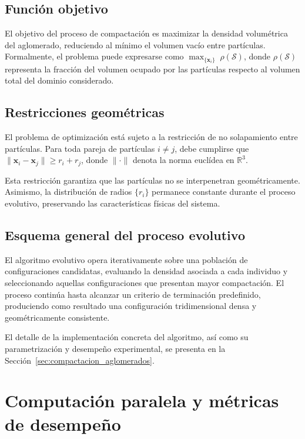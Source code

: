 \documentclass[a4paper,11pt]{book}
\begin{document}
\subsection{Función objetivo}

El objetivo del proceso de compactación es maximizar la densidad volumétrica del aglomerado, reduciendo al mínimo el volumen vacío entre partículas. Formalmente, el problema puede expresarse como $\max_{\{\mathbf{x}_i\}} \; \rho(\mathcal{S})$, donde $\rho(\mathcal{S})$ representa la fracción del volumen ocupado por las partículas respecto al volumen total del dominio considerado.

\subsection{Restricciones geométricas}

El problema de optimización está sujeto a la restricción de no solapamiento entre partículas. Para toda pareja de partículas $i \neq j$, debe cumplirse que $\| \mathbf{x}_i - \mathbf{x}_j \| \ge r_i + r_j$, donde $\|\cdot\|$ denota la norma euclídea en $\mathbb{R}^3$.

Esta restricción garantiza que las partículas no se interpenetran geométricamente. Asimismo, la distribución de radios $\{r_i\}$ permanece constante durante el proceso evolutivo, preservando las características físicas del sistema.

\subsection{Esquema general del proceso evolutivo}

El algoritmo evolutivo opera iterativamente sobre una población de configuraciones candidatas, evaluando la densidad asociada a cada individuo y seleccionando aquellas configuraciones que presentan mayor compactación. El proceso continúa hasta alcanzar un criterio de terminación predefinido, produciendo como resultado una configuración tridimensional densa y geométricamente consistente.

El detalle de la implementación concreta del algoritmo, así como su parametrización y desempeño experimental, se presenta en la Sección~\ref{sec:compactacion_aglomerados}.




\section{Computación paralela y métricas de desempeño}
\label{sec:computacion_paralela_metricas}
\end{document}
